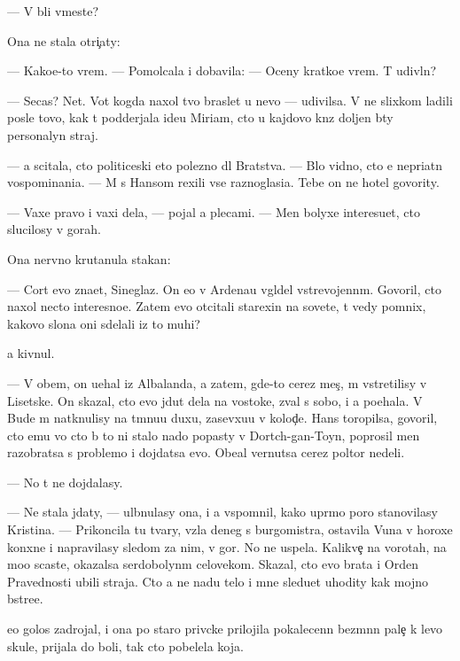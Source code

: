\documentclass[10pt]{book}
\begin{document}
— V{\yi} b{\yi}li vmeste?

Ona ne stala otri{\c}aty:

— Kako{\y}e-to vrem{\ia}. — Pomolcala i dobavila: — Oceny kratko{\y}e vrem{\ia}. T{\yi} udivl{\e}n?

— Se{\y}cas? Net. Vot kogda naxol tvo{\y} braslet u nevo — udivilsa. V{\yi} ne slixkom ladili posle tovo, kak t{\yi} podderjala ide{\y}u Miriam, cto u kajdovo kn{\ia}z{\ia} doljen b{\yi}ty personalyn{\yi}{\y} straj.

— {\Y}a scitala, cto politiceski eto polezno dl{\ia} Bratstva. — B{\yi}lo vidno, cto {\y}e{\y} nepri{\y}atn{\yi} vospominani{\y}a. — M{\yi} s Hansom rexili vse raznoglasi{\y}a. Tebe on ne hotel govority.

— Vaxe pravo i vaxi dela, — pojal {\y}a plecami. — Men{\ia} bolyxe interesu{\y}et, cto slucilosy v gorah.

Ona nervno krutanula stakan:

— Cort {\y}evo zna{\y}et, Sineglaz{\yi}{\y}. On {\y}e{\x}o v Ardenau v{\yi}gl{\ia}del vstrevojenn{\yi}m. Govoril, cto naxol necto interesno{\y}e. Zatem {\y}evo otcitali stare{\y}xin{\yi} na sovete, t{\yi} vedy pomnix, kakovo slona oni sdelali iz to{\y} muhi?

{\Y}a kivnul.

— V ob{\x}em, on u{\y}ehal iz Albalanda, a zatem, gde-to cerez mes{\ia}{\c}, m{\yi} vstretilisy v Lisetske. On skazal, cto {\y}evo jdut dela na vostoke, zval s sobo{\y}, i {\y}a po{\y}ehala. V Bude m{\yi} natknulisy na t{\e}mnu{\y}u duxu, zasevxu{\y}u v kolod{\c}e. Hans toropilsa, govoril, cto {\y}emu vo cto b{\yi} to ni stalo nado popasty v Dortch-gan-Toyn, poprosil men{\ia} razobratsa s problemo{\y} i dojdatsa {\y}evo. Obe{\x}al vernutsa cerez poltor{\yi} nedeli.

— No t{\yi} ne dojdalasy.

— Ne stala jdaty, — ul{\yi}bnulasy ona, i {\y}a vspomnil, kako{\y} upr{\ia}mo{\y} poro{\y} stanovilasy Kristina. — Prikoncila tu tvary, vz{\ia}la deneg s burgomistra, ostavila V{\y}una v horoxe{\y} kon{\iu}xne i napravilasy sledom za nim, v gor{\yi}. No ne uspela. Kalikve{\c} na vorotah, na mo{\y}o scast{\y}e, okazalsa serdobolyn{\yi}m celovekom. Skazal, cto {\y}evo brat{\y}a i Orden Pravednosti ubili straja. Cto {\y}a ne na{\y}du telo i mne sledu{\y}et uhodity kak mojno b{\yi}stre{\y}e.

{\Y}e{\y}o golos zadrojal, i ona po staro{\y} priv{\yi}cke prilojila pokalecenn{\yi}{\y} bez{\yi}m{\ia}nn{\yi}{\y} pale{\c} k levo{\y} skule, prijala do boli, tak cto pobelela koja.
\end{document}
